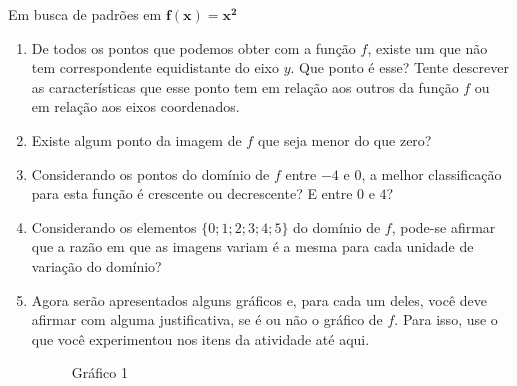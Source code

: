 \begin{task}{Em busca de padrões em \(\bm{f(x)=x^2}\)}
\begin{enumerate}
\item {} 
De todos os pontos que podemos obter com a função \(f\), existe um que não tem correspondente equidistante do eixo \(y\). Que ponto é esse? Tente descrever as características que esse ponto tem em relação aos outros da função \(f\) ou em relação aos eixos coordenados.

\item {} 
Existe algum ponto da imagem de \(f\) que seja menor do que zero?

\item {} 
Considerando os pontos do domínio de \(f\) entre \(-4\) e \(0\), a melhor classificação para esta função é crescente ou decrescente? E entre \(0\) e \(4\)?

\item {} 
Considerando os elementos \(\{ 0; 1; 2; 3; 4; 5 \}\) do domínio de \(f\), pode-se afirmar que a razão em que as imagens variam é a mesma para cada unidade de variação do domínio?

\item {} 
Agora serão apresentados alguns gráficos e, para cada um deles, você deve afirmar com alguma justificativa, se é ou não o gráfico de \(f\). Para isso, use o que você experimentou nos itens da atividade até aqui.

\begin{multicols}{2}
\begin{figure}[H]
\centering

\caption{Gráfico 1}
\end{figure}


\end{multicols}
\end{enumerate}
\end{task}

